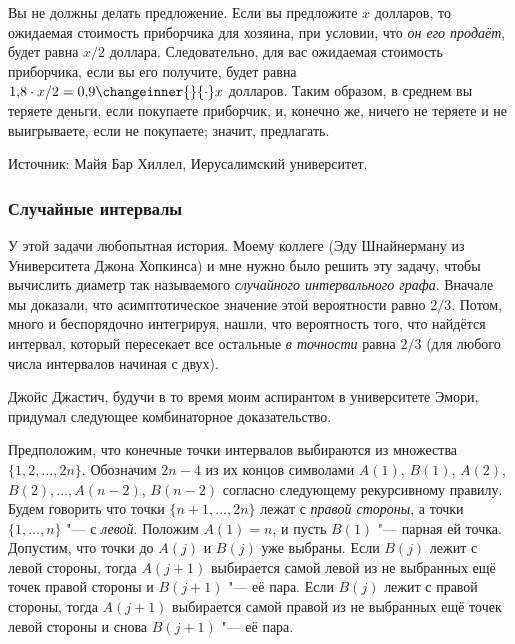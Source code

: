 \documentclass[twoside]{book}
\begin{document}
Вы не должны делать предложение.
Если вы предложите $x$ долларов, то ожидаемая стоимость приборчика для хозяина, при условии, что \emph{он его продаёт}, будет равна $x/2$ доллара.
Следовательно, для вас ожидаемая стоимость приборчика, если вы его получите, будет равна $1{,}8 \cdot  x/2=0{,}9\changeinner{}{\cdot} x$ долларов.
Таким образом, в среднем вы теряете деньги, если покупаете приборчик, и, конечно же, ничего не теряете и не выигрываете, если не покупаете;
значит,  предлагать.
\heart

\medskip
{\small 
  Источник: Майя Бар Хиллел, Иерусалимский университет.

  }

\subsubsection*{Случайные интервалы}%

У этой задачи любопытная история.
Моему коллеге (Эду Шнайнерману из Университета Джона Хопкинса) и мне нужно было решить эту задачу, чтобы вычислить диаметр так называемого \emph{случайного интервального графа}. 
Вначале мы доказали, что асимптотическое значение этой вероятности равно $2/3$.
Потом, много и беспорядочно интегрируя, нашли, что вероятность того, что найдётся интервал, который пересекает все остальные \emph{в точности} равна $2/3$ (для любого числа интервалов начиная с двух).

Джойс Джастич, %
будучи в то время моим аспирантом в университете Эмори, придумал следующее комбинаторное доказательство.
 

Предположим, что конечные точки интервалов выбираются из множества $\{1,2,\dots,2n\}$.
Обозначим $2n-4$ из их концов символами $A(1)$, $B(1)$, $A(2)$, $B(2),\dots, A(n-2)$, $B(n-2)$ согласно следующему рекурсивному правилу.
Будем говорить что точки $\{n+1, \dots , 2n\}$ лежат с \emph{правой стороны}, а точки $\{1, \dots , n\}$ "--- с \emph{левой}.
Положим $A(1)=n$, и пусть $B(1)$ "--- парная ей точка.
Допустим, что точки до $A(j)$ и $B(j)$ уже выбраны. 
Если $B(j)$ лежит с левой стороны, тогда $A(j+1)$ выбирается самой левой из не выбранных ещё точек правой стороны и $B(j+1)$ "--- её пара.
Если $B(j)$ лежит с правой стороны, тогда $A(j+1)$ выбирается самой правой из не выбранных ещё точек левой стороны и снова $B(j+1)$ "--- её пара.
\end{document}
